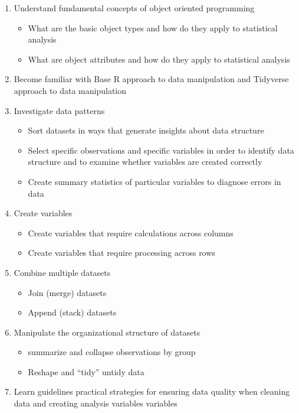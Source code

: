 \documentclass[11pt,]{article}
\providecommand{\tightlist}{%
  \setlength{\itemsep}{0pt}\setlength{\parskip}{0pt}}
\begin{document}
\begin{enumerate}
\def\labelenumi{\arabic{enumi}.}
\tightlist
\item
  Understand fundamental concepts of object oriented programming

  \begin{itemize}
  \tightlist
  \item
    What are the basic object types and how do they apply to statistical
    analysis
  \item
    What are object attributes and how do they apply to statistical
    analysis
  \end{itemize}
\item
  Become familiar with Base R approach to data manipulation and
  Tidyverse approach to data manipulation
\item
  Investigate data patterns

  \begin{itemize}
  \tightlist
  \item
    Sort datasets in ways that generate insights about data structure
  \item
    Select specific observations and specific variables in order to
    identify data structure and to examine whether variables are created
    correctly
  \item
    Create summary statistics of particular variables to diagnose errors
    in data
  \end{itemize}
\item
  Create variables

  \begin{itemize}
  \tightlist
  \item
    Create variables that require calculations across columns
  \item
    Create variables that require processing across rows
  \end{itemize}
\item
  Combine multiple datasets

  \begin{itemize}
  \tightlist
  \item
    Join (merge) datasets
  \item
    Append (stack) datasets
  \end{itemize}
\item
  Manipulate the organizational structure of datasets

  \begin{itemize}
  \tightlist
  \item
    summarize and collapse observations by group
  \item
    Reshape and ``tidy'' untidy data
  \end{itemize}
\item
  Learn guidelines practical strategies for ensuring data quality when
  cleaning data and creating analysis variables variables
\end{enumerate}
\end{document}
